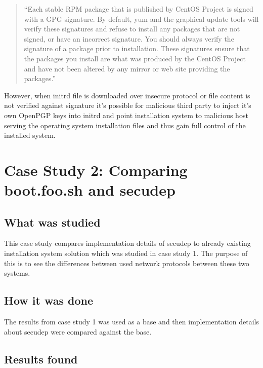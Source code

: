 \begin{quote}
``Each stable RPM package that is published by CentOS Project is signed
with a GPG signature. By default, yum and the graphical update tools
will verify these signatures and refuse to install any packages that
are not signed, or have an incorrect signature. You should always
verify the signature of a package prior to installation. These
signatures ensure that the packages you install are what was produced
by the CentOS Project and have not been altered by any mirror or
web site providing the packages.''
\end{quote}

However, when initrd file is downloaded over insecure protocol or file
content is not verified against signature it's possible for malicious
third party to inject it's own OpenPGP keys into initrd and point
installation system to malicious host serving the operating system
installation files and thus gain full control of the installed system.


\section{Case Study 2: Comparing boot.foo.sh and secudep}
\label{sec:casestudy2}

\subsection{What was studied}

This case study compares implementation details of secudep to already
existing installation system solution which was studied in case study
1. The purpose of this is to see the differences between used network
protocols between these two systems.

\subsection{How it was done}

The results from case study 1 was used as a base and then
implementation details about secudep were compared against the base.

\subsection{Results found}

